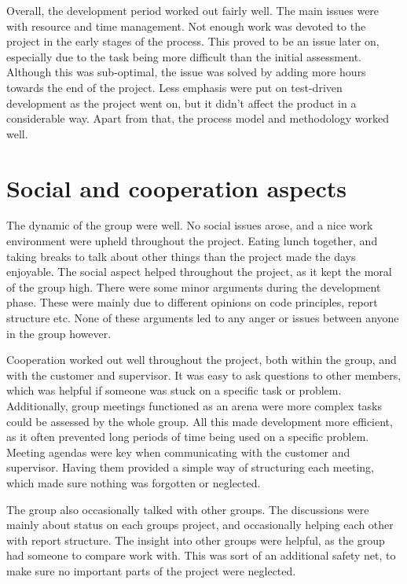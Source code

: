 Overall, the development period worked out fairly well. The main issues were with resource and time management. Not enough work was devoted to the project in the early stages of the process. This proved to be an issue later on, especially due to the task being more difficult than the initial assessment. Although this was sub-optimal, the issue was solved by adding more hours towards the end of the project. Less emphasis were put on test-driven development as the project went on, but it didn't affect the product in a considerable way. Apart from that, the process model and methodology worked well.


\section{Social and cooperation aspects}
\label{sec:Social_and_cooperation_aspects}

The dynamic of the group were well. No social issues arose, and a nice work environment were upheld throughout the project. Eating lunch together, and taking breaks to talk about other things than the project made the days enjoyable. The social aspect helped throughout the project, as it kept the moral of the group high. There were some minor arguments during the development phase. These were mainly due to different opinions on code principles, report structure etc. None of these arguments led to any anger or issues between anyone in the group however.

Cooperation worked out well throughout the project, both within the group, and with the customer and supervisor. It was easy to ask questions to other members, which was helpful if someone was stuck on a specific task or problem. Additionally, group meetings functioned as an arena were more complex tasks could be assessed by the whole group. All this made development more efficient, as it often prevented long periods of time being used on a specific problem. Meeting agendas were key when communicating with the customer and supervisor. Having them provided a simple way of structuring each meeting, which made sure nothing was forgotten or neglected.

The group also occasionally talked with other groups. The discussions were mainly about status on each groups project, and occasionally helping each other with report structure. The insight into other groups were helpful, as the group had someone to compare work with. This was sort of an additional safety net, to make sure no important parts of the project were neglected.

